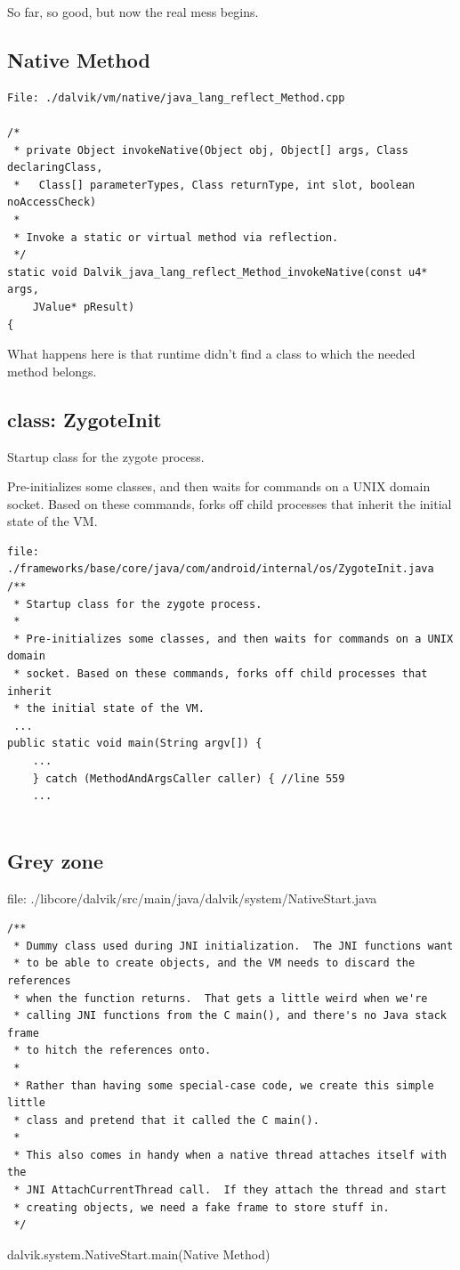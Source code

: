 \documentclass[11pt,a4paper]{article}
\begin{document}
So far, so good, but now the real mess begins.


\subsection{Native Method}

\scriptsize
\begin{verbatim}
File: ./dalvik/vm/native/java_lang_reflect_Method.cpp

/*
 * private Object invokeNative(Object obj, Object[] args, Class declaringClass,
 *   Class[] parameterTypes, Class returnType, int slot, boolean noAccessCheck)
 *
 * Invoke a static or virtual method via reflection.
 */
static void Dalvik_java_lang_reflect_Method_invokeNative(const u4* args,
    JValue* pResult)
{
\end{verbatim}
\normalsize

What happens here is that runtime didn't find a class to which the needed method belongs. 


\subsection{class: ZygoteInit}

Startup class for the zygote process.
 
Pre-initializes some classes, and then waits for commands on a UNIX domain socket. Based on these commands, forks off child processes that inherit the initial state of the VM.

\scriptsize
\begin{verbatim}
file: ./frameworks/base/core/java/com/android/internal/os/ZygoteInit.java
/**
 * Startup class for the zygote process.
 *
 * Pre-initializes some classes, and then waits for commands on a UNIX domain
 * socket. Based on these commands, forks off child processes that inherit
 * the initial state of the VM.
 ...
public static void main(String argv[]) {
    ...
    } catch (MethodAndArgsCaller caller) { //line 559
	...
	
\end{verbatim}
\normalsize


\subsection{Grey zone}

file: ./libcore/dalvik/src/main/java/dalvik/system/NativeStart.java
\scriptsize
\begin{verbatim}
/**
 * Dummy class used during JNI initialization.  The JNI functions want
 * to be able to create objects, and the VM needs to discard the references
 * when the function returns.  That gets a little weird when we're
 * calling JNI functions from the C main(), and there's no Java stack frame
 * to hitch the references onto.
 *
 * Rather than having some special-case code, we create this simple little
 * class and pretend that it called the C main().
 *
 * This also comes in handy when a native thread attaches itself with the
 * JNI AttachCurrentThread call.  If they attach the thread and start
 * creating objects, we need a fake frame to store stuff in.
 */
\end{verbatim}
dalvik.system.NativeStart.main(Native Method)
\end{document}
